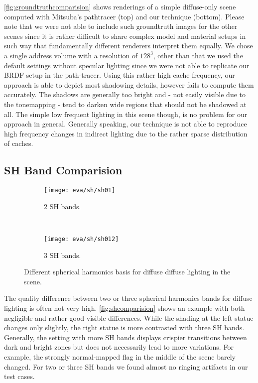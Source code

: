 \documentclass[thesis.tex]{subfiles}
\begin{document}
\autoref{fig:groundtruthcomparision} shows renderings of a simple diffuse-only scene computed with Mitsuba's pathtracer \cite{bib:mitsuba} (top) and our technique (bottom).
Please note that we were not able to include such groundtruth images for the other scenes since it is rather difficult to share complex model and material setups in such way that fundamentally different renderers interpret them equally.
We chose a single address volume with a resolution of $128^3$, other than that we used the default settings without specular lighting since we were not able to replicate our BRDF setup in the path-tracer.
Using this rather high cache frequency, our approach is able to depict most shadowing details, however fails to compute them accurately.
The shadows are generally too bright and - not easily visible due to the tonemapping - tend to darken wide regions that should not be shadowed at all.
The simple low frequent lighting in this scene though, is no problem for our approach in general.
Generally speaking, our technique is not able to reproduce high frequency changes in indirect lighting due to the rather sparse distribution of caches.

\subsection{SH Band Comparision}
\begin{figure}[h]
\centering
\begin{subfigure}[b]{0.9\textwidth}
\texttt{[image: eva/sh/sh01]}
\caption{2 SH bands.}
\end{subfigure}
\\
\begin{subfigure}[b]{0.9\textwidth}
\texttt{[image: eva/sh/sh012]}
\caption{3 SH bands.}
\end{subfigure}
\caption{Different spherical harmonics basis for diffuse diffuse lighting in the  scene.}
\label{fig:shcomparision}
\end{figure}
The quality difference between two or three spherical harmonics bands for diffuse lighting is often not very high.
\autoref{fig:shcomparision} shows an example with both negligible and rather good visible differences.
While the shading at the left statue changes only slightly, the right statue is more contrasted with three SH bands.
Generally, the setting with more SH bands displays crispier transitions between dark and bright zones but does not necessarily lead to more variations.
For example, the strongly normal-mapped flag in the middle of the scene barely changed.
For two or three SH bands we found almost no ringing artifacts in our test cases.
\end{document}
